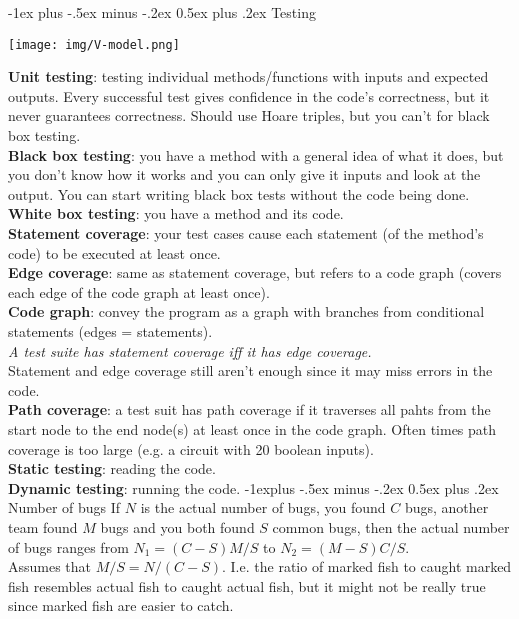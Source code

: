 \documentclass[10pt,landscape]{article}
\makeatletter
\renewcommand{\section}{\@startsection{section}{1}{0mm}%
                                {-1ex plus -.5ex minus -.2ex}%
                                {0.5ex plus .2ex}%
                                {\normalfont\large\bfseries}}
\renewcommand{\subsection}{\@startsection{subsection}{2}{0mm}%
                                {-1explus -.5ex minus -.2ex}%
                                {0.5ex plus .2ex}%
                                {\normalfont\normalsize\bfseries}}
\makeatother
\begin{document}
\begin{multicols}{3}
\section{Testing}
{\centering\texttt{[image: img/V-model.png]}\par}
\textbf{Unit testing}: testing individual methods/functions with inputs and expected outputs. Every successful test gives confidence in the code's correctness, but it never guarantees correctness. Should use Hoare triples, but you can't for black box testing.\\
\textbf{Black box testing}: you have a method with a general idea of what it does, but you don't know how it works and you can only give it inputs and look at the output. You can start writing black box tests without the code being done.\\
\textbf{White box testing}: you have a method and its code.\\
\textbf{Statement coverage}: your test cases cause each statement (of the method's code) to be executed at least once.\\
\textbf{Edge coverage}: same as statement coverage, but refers to a code graph (covers each edge of the code graph at least once).\\
\textbf{Code graph}: convey the program as a graph with branches from conditional statements (edges = statements).\\
\textit{A test suite has statement coverage iff it has edge coverage.}\\
Statement and edge coverage still aren't enough since it may miss errors in the code.\\
\textbf{Path coverage}: a test suit has path coverage if it traverses all pahts from the start node to the end node(s) at least once in the code graph. Often times path coverage is too large (e.g. a circuit with 20 boolean inputs).\\
\textbf{Static testing}: reading the code.\\
\textbf{Dynamic testing}: running the code.
\subsection{Number of bugs}
If $N$ is the actual number of bugs, you found $C$ bugs, another team found $M$ bugs and you both found $S$ common bugs, then the actual number of bugs ranges from $N_1=(C-S)M/S$ to $N_2=(M-S)C/S$.\\
Assumes that $M/S = N/(C-S)$. I.e. the ratio of marked fish to caught marked fish resembles actual fish to caught actual fish, but it might not be really true since marked fish are easier to catch.
\end{multicols}
\end{document}
